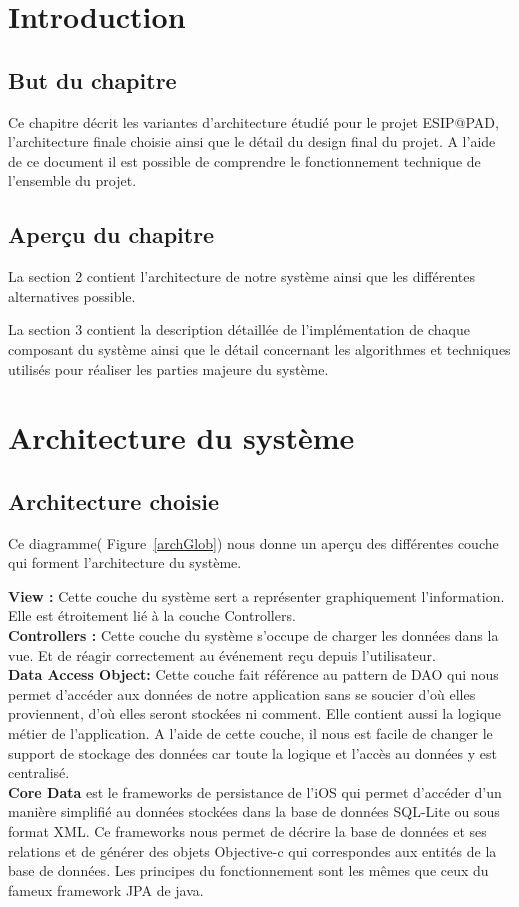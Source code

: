 \section{Introduction}
	\subsection{But du chapitre}
		Ce chapitre décrit les variantes d'architecture étudié pour le projet ESIP@PAD, l'architecture finale choisie ainsi que le détail du design final du projet. A l'aide de ce document il est possible de comprendre le fonctionnement technique de l'ensemble du projet.
	\subsection{Aperçu du chapitre}
	La section 2 contient l'architecture de notre système ainsi que les différentes alternatives possible. 
	
	La section 3 contient la description détaillée de l'implémentation de chaque composant du système ainsi que le détail concernant les algorithmes et techniques utilisés pour réaliser les parties majeure du système.

\section{Architecture du système }
	\subsection{Architecture choisie}	
		 Ce diagramme( Figure~\ref{archGlob}) nous donne un aperçu des différentes couche qui forment l'architecture du système.
		 
		 \textbf{View : } Cette couche du système sert a représenter graphiquement l'information. Elle est étroitement lié à la couche Controllers.\\[0.5cm]
		 \textbf{Controllers :} Cette couche du système s'occupe de charger les données dans la vue. Et de réagir correctement au événement reçu depuis l'utilisateur.\\[0.5cm]
		\textbf{Data Access Object:} Cette couche fait référence au pattern  de DAO \cite{daoMsc} qui nous permet d'accéder aux données de notre application sans se soucier d'où elles proviennent, d'où elles seront stockées ni comment. Elle contient aussi la logique métier de l'application. A l'aide de cette couche, il nous est facile de changer le support de stockage des données car toute la logique et l'accès au données y est centralisé. \\[0.5cm]
		\textbf{Core Data} est le frameworks de persistance de l'iOS qui permet d'accéder d'un manière simplifié au données stockées dans la base de données SQL-Lite ou sous format XML. Ce frameworks nous permet de décrire la base de données et ses relations et de générer des objets Objective-c qui correspondes aux entités de la base de données. Les principes du fonctionnement sont les mêmes que ceux du fameux framework JPA\cite{jpaNMSC} de java.


